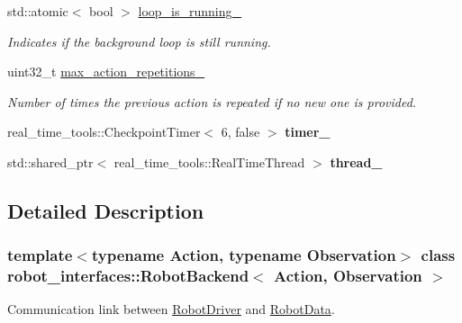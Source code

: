\begin{DoxyCompactItemize}
\mbox{\label{classrobot__interfaces_1_1RobotBackend_a0e91800b352b7b52f22820775b1d5e99}} 
std\+::atomic$<$ bool $>$ \hyperlink{classrobot__interfaces_1_1RobotBackend_a0e91800b352b7b52f22820775b1d5e99}{loop\+\_\+is\+\_\+running\+\_\+}
\begin{DoxyCompactList}\small\item\em Indicates if the background loop is still running. \end{DoxyCompactList}\item 
\mbox{\label{classrobot__interfaces_1_1RobotBackend_ae40ecdc44212f79f96d63a84f7b8a6e8}} 
uint32\+\_\+t \hyperlink{classrobot__interfaces_1_1RobotBackend_ae40ecdc44212f79f96d63a84f7b8a6e8}{max\+\_\+action\+\_\+repetitions\+\_\+}
\begin{DoxyCompactList}\small\item\em Number of times the previous action is repeated if no new one is provided. \end{DoxyCompactList}\item 
\mbox{\label{classrobot__interfaces_1_1RobotBackend_a69c9b7f07651484d1677121f72832482}} 
real\+\_\+time\+\_\+tools\+::\+Checkpoint\+Timer$<$ 6, false $>$ {\bfseries timer\+\_\+}
\item 
\mbox{\label{classrobot__interfaces_1_1RobotBackend_afcf4f2443b7f3000cece9b0851284717}} 
std\+::shared\+\_\+ptr$<$ real\+\_\+time\+\_\+tools\+::\+Real\+Time\+Thread $>$ {\bfseries thread\+\_\+}
\end{DoxyCompactItemize}


\subsection{Detailed Description}
\subsubsection*{template$<$typename Action, typename Observation$>$\newline
class robot\+\_\+interfaces\+::\+Robot\+Backend$<$ Action, Observation $>$}

Communication link between \hyperlink{classrobot__interfaces_1_1RobotDriver}{Robot\+Driver} and \hyperlink{classrobot__interfaces_1_1RobotData}{Robot\+Data}. 

